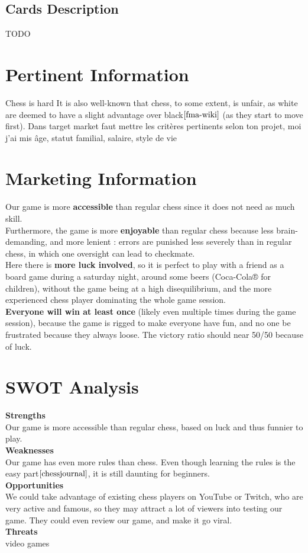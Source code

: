 \documentclass[12pt]{article}
\begin{document}
        \subsection{Cards Description}
            TODO
    
    \section{Pertinent Information}
        Chess is hard
        It is also well-known that chess, to some extent, is unfair, as white are deemed to have a slight advantage over black$\cite{fma-wiki}$  (as they start to move first).
        Dans target market faut mettre les critères pertinents selon ton projet, moi j'ai mis âge, statut familial, salaire, style de vie
    
    \section{Marketing Information}
        Our game is more \textbf{accessible} than regular chess since it does not need as much skill.
        \\Furthermore, the game is more \textbf{enjoyable} than regular chess because less brain-demanding, and more lenient : errors are punished less severely than in regular chess, in which one oversight can lead to checkmate.
        \\Here there is \textbf{more luck involved}, so it is perfect to play with a friend as a board game during a saturday night, around some beers (Coca-Cola® for children), without the game being at a high disequilibrium, and the more experienced chess player dominating the whole game session.
        \\\textbf{Everyone will win at least once} (likely even multiple times during the game session), because the game is rigged to make everyone have fun, and no one be frustrated because they always loose. The victory ratio should near 50/50 because of luck.

    
    \section{SWOT Analysis}
    \textbf{Strengths}
    \\Our game is more accessible than regular chess, based on luck and thus funnier to play.
    \\\textbf{Weaknesses}
    \\Our game has even more rules than chess. Even though learning the rules is the easy part$\cite{chessjournal}$, it is still daunting for beginners.
    \\\textbf{Opportunities}
    \\We could take advantage of existing chess players on YouTube or Twitch, who are very active and famous, so they may attract a lot of viewers into testing our game. They could even review our game, and make it go viral.
    \\\textbf{Threats} 
    \\video games
\end{document}
